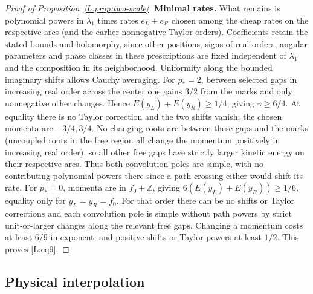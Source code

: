 \begin{proof}[Proof of Proposition~\ref{L:prop:two-scale}]
\par\medskip\noindent\textbf{Minimal rates.}
What remains is polynomial powers in \(\lambda_1\) times rates \(e_L+e_R\) chosen among the cheap rates on the respective arcs (and the earlier nonnegative Taylor orders). Coefficients retain the stated bounds and holomorphy, since other positions, signs of real orders, angular parameters and phase classes in these prescriptions are fixed independent of \(\lambda_1\) and the composition in its neighborhood. Uniformity along the bounded imaginary shifts allows Cauchy averaging. For \(p_*=2\), between selected gaps in increasing real order across the center one gains \(3/2\) from the marks and only nonnegative other changes. Hence \(E(y_L)+E(y_R)\ge1/4\), giving \(\gamma\ge6/4\). At equality there is no Taylor correction and the two shifts vanish; the chosen momenta are \(-3/4,3/4\). No changing roots are between these gaps and the marks (uncoupled roots in the free region all change the momentum positively in increasing real order), so all other free gaps have strictly larger kinetic energy on their respective arcs. Thus both convolution poles are simple, with no contributing polynomial powers there since a path crossing either would shift its rate. For \(p_*=0\), momenta are in \(f_0+\mathbb Z\), giving \(6(E(y_L)+E(y_R))\ge1/6\), equality only for \(y_L=y_R=f_0\). For that order there can be no shifts or Taylor corrections and each convolution pole is simple without path powers by strict unit-or-larger changes along the relevant free gaps. Changing a momentum costs at least \(6/9\) in exponent, and positive shifts or Taylor powers at least \(1/2\). This proves \eqref{L:eq9}.


\end{proof}

\subsection{Physical interpolation}\label{L:step16}

